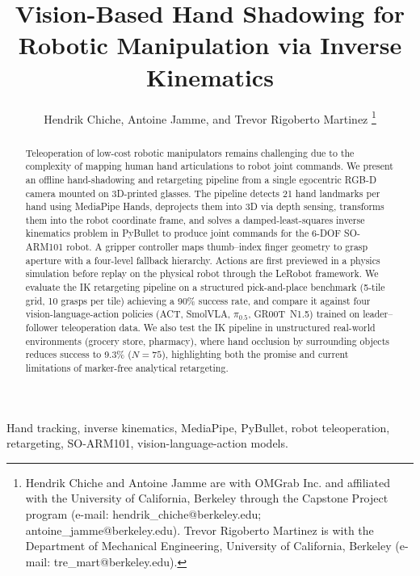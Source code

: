 \documentclass[10pt,journal]{IEEEtran}
\begin{document}
\title{Vision-Based Hand Shadowing for Robotic Manipulation via Inverse Kinematics}

\author{Hendrik Chiche, Antoine Jamme, and Trevor Rigoberto Martinez%
\thanks{Hendrik Chiche and Antoine Jamme are with OMGrab Inc. and affiliated with the University of California, Berkeley through the Capstone Project program (e-mail: hendrik\_chiche@berkeley.edu; antoine\_jamme@berkeley.edu). Trevor Rigoberto Martinez is with the Department of Mechanical Engineering, University of California, Berkeley (e-mail: tre\_mart@berkeley.edu).}%
}

\begin{abstract}
Teleoperation of low-cost robotic manipulators remains challenging due to the
complexity of mapping human hand articulations to robot joint commands.
We present an offline hand-shadowing and retargeting pipeline from a
single egocentric RGB-D camera mounted on 3D-printed glasses. The pipeline
detects 21 hand landmarks per hand using MediaPipe Hands, deprojects them
into 3D via depth sensing, transforms them into the robot coordinate frame,
and solves a damped-least-squares inverse kinematics problem in PyBullet to
produce joint commands for the 6-DOF SO-ARM101 robot. A gripper controller
maps thumb--index finger geometry to grasp aperture with a four-level
fallback hierarchy. Actions are first previewed in a physics simulation
before replay on the physical robot through the LeRobot framework.
We evaluate the IK retargeting pipeline on a structured pick-and-place
benchmark (5-tile grid, 10 grasps per tile) achieving a 90\% success rate,
and compare it against four vision-language-action policies
(ACT, SmolVLA, $\pi_{0.5}$, GR00T~N1.5) trained on
leader--follower teleoperation data. We also test the IK pipeline
in unstructured real-world environments (grocery store, pharmacy),
where hand occlusion by surrounding objects reduces success to
9.3\% ($N=75$), highlighting both the promise and current limitations
of marker-free analytical retargeting.
\end{abstract}

\begin{IEEEkeywords}
Hand tracking, inverse kinematics, MediaPipe, PyBullet, robot teleoperation,
retargeting, SO-ARM101, vision-language-action models.
\end{IEEEkeywords}

\maketitle
\end{document}
